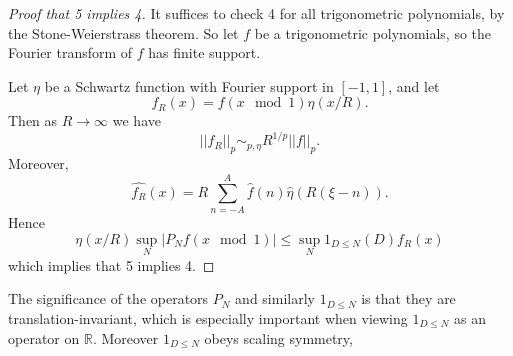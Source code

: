 \documentclass[12pt]{report}
\newcommand{\RR}{\mathbb{R}}
\theoremstyle{definition}
\begin{document}
\begin{proof}[Proof that 5 implies 4]
It suffices to check 4 for all trigonometric polynomials, by the Stone-Weierstrass theorem.
So let $f$ be a trigonometric polynomials, so the Fourier transform of $f$ has finite support.

Let $\eta$ be a Schwartz function with Fourier support in $[-1, 1]$, and let
$$f_R(x) = f(x \mod 1)\eta(x/R).$$
Then as $R \to \infty$ we have
$$||f_R||_p \sim_{p, \eta} R^{1/p} ||f||_p.$$
Moreover,
$$\widehat{f_R}(x) = R \sum_{n=-A}^A \hat f(n) \hat \eta(R(\xi - n)).$$
Hence
$$\eta(x/R) \sup_N |P_Nf(x \mod 1)| \leq \sup_N 1_{D \leq N}(D) f_R(x)$$
which implies that 5 implies 4.
\end{proof}

The significance of the operators $P_N$ and similarly $1_{D \leq N}$ is that they are translation-invariant, which is especially important when viewing $1_{D \leq N}$ as an operator on $\RR$. Moreover $1_{D \leq N}$ obeys scaling symmetry,
\end{document}
